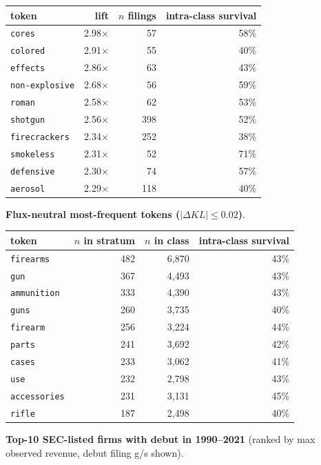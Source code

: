 \begin{tabular}{lrrr}
\toprule
token & lift & $n$ filings & intra-class survival \\
\midrule
\texttt{cores} & 2.98$\times$ & 57 & 58\% \\
\texttt{colored} & 2.91$\times$ & 55 & 40\% \\
\texttt{effects} & 2.86$\times$ & 63 & 43\% \\
\texttt{non-explosive} & 2.68$\times$ & 56 & 59\% \\
\texttt{roman} & 2.58$\times$ & 62 & 53\% \\
\texttt{shotgun} & 2.56$\times$ & 398 & 52\% \\
\texttt{firecrackers} & 2.34$\times$ & 252 & 38\% \\
\texttt{smokeless} & 2.31$\times$ & 52 & 71\% \\
\texttt{defensive} & 2.30$\times$ & 74 & 57\% \\
\texttt{aerosol} & 2.29$\times$ & 118 & 40\% \\
\bottomrule
\end{tabular}

\textbf{Flux-neutral most-frequent tokens ($|\Delta KL|\leq 0.02$)}.

\begin{tabular}{lrrr}
\toprule
token & $n$ in stratum & $n$ in class & intra-class survival \\
\midrule
\texttt{firearms} & 482 & 6,870 & 43\% \\
\texttt{gun} & 367 & 4,493 & 43\% \\
\texttt{ammunition} & 333 & 4,390 & 43\% \\
\texttt{guns} & 260 & 3,735 & 40\% \\
\texttt{firearm} & 256 & 3,224 & 44\% \\
\texttt{parts} & 241 & 3,692 & 42\% \\
\texttt{cases} & 233 & 3,062 & 41\% \\
\texttt{use} & 232 & 2,798 & 43\% \\
\texttt{accessories} & 231 & 3,131 & 45\% \\
\texttt{rifle} & 187 & 2,498 & 40\% \\
\bottomrule
\end{tabular}

\textbf{Top-10 SEC-listed firms with debut in 1990--2021} (ranked by max observed revenue, debut filing g/s shown).

